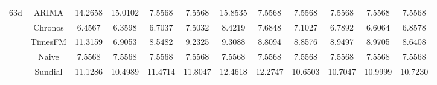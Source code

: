 \begin{table}[H]
{\begin{tabular}{cccccccccccc}
\midrule
\multirow[c]{5}{*}{63d} & ARIMA & 14.2658 & 15.0102 & 7.5568 & 7.5568 & 15.8535 & 7.5568 & 7.5568 & 7.5568 & 7.5568 & 7.5568 \\
 & Chronos & 6.4567 & 6.3598 & 6.7037 & 7.5032 & 8.4219 & 7.6848 & 7.1027 & 6.7892 & 6.6064 & 6.8578 \\
 & TimesFM & 11.3159 & 6.9053 & 8.5482 & 9.2325 & 9.3088 & 8.8094 & 8.8576 & 8.9497 & 8.9705 & 8.6408 \\
 & Naive & 7.5568 & 7.5568 & 7.5568 & 7.5568 & 7.5568 & 7.5568 & 7.5568 & 7.5568 & 7.5568 & 7.5568 \\
 & Sundial & 11.1286 & 10.4989 & 11.4714 & 11.8047 & 12.4618 & 12.2747 & 10.6503 & 10.7047 & 10.9999 & 10.7230 \\
\bottomrule
\end{tabular}

 }
\end{table}